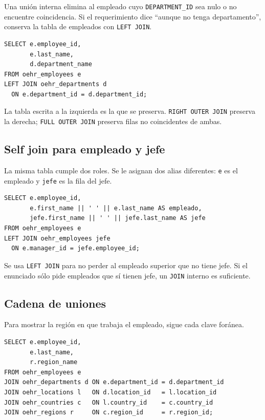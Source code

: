 \documentclass[11pt,a4paper]{article}
\newcommand{\campo}[1]{\texttt{#1}}
\begin{document}
Una unión interna elimina al empleado cuyo \campo{DEPARTMENT\_ID} sea nulo o no encuentre
coincidencia. Si el requerimiento dice ``aunque no tenga departamento'', conserva la tabla de
empleados con \campo{LEFT JOIN}.

\begin{lstlisting}
SELECT e.employee_id,
       e.last_name,
       d.department_name
FROM oehr_employees e
LEFT JOIN oehr_departments d
  ON e.department_id = d.department_id;
\end{lstlisting}

La tabla escrita a la izquierda es la que se preserva. \campo{RIGHT OUTER JOIN} preserva la derecha;
\campo{FULL OUTER JOIN} preserva filas no coincidentes de ambas.

\subsection{Self join para empleado y jefe}

La misma tabla cumple dos roles. Se le asignan dos alias diferentes: \campo{e} es el empleado y
\campo{jefe} es la fila del jefe.

\begin{lstlisting}
SELECT e.employee_id,
       e.first_name || ' ' || e.last_name AS empleado,
       jefe.first_name || ' ' || jefe.last_name AS jefe
FROM oehr_employees e
LEFT JOIN oehr_employees jefe
  ON e.manager_id = jefe.employee_id;
\end{lstlisting}

Se usa \campo{LEFT JOIN} para no perder al empleado superior que no tiene jefe. Si el enunciado sólo
pide empleados que sí tienen jefe, un \campo{JOIN} interno es suficiente.

\subsection{Cadena de uniones}

Para mostrar la región en que trabaja el empleado, sigue cada clave foránea.

\begin{lstlisting}
SELECT e.employee_id,
       e.last_name,
       r.region_name
FROM oehr_employees e
JOIN oehr_departments d ON e.department_id = d.department_id
JOIN oehr_locations l   ON d.location_id   = l.location_id
JOIN oehr_countries c   ON l.country_id    = c.country_id
JOIN oehr_regions r     ON c.region_id     = r.region_id;
\end{lstlisting}
\end{document}
